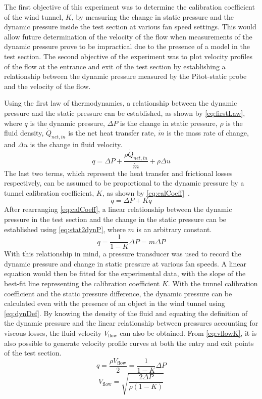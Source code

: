 \documentclass[journal,letterpaper]{IEEEtran}
\begin{document}
The first objective of this experiment was to determine the calibration coefficient of the wind tunnel, $K$, by measuring the change in static pressure and the dynamic pressure inside the test section at various fan speed settings.
This would allow future determination of the velocity of the flow when measurements of the dynamic pressure prove to be impractical due to the presence of a model in the test section.
The second objective of the experiment was to plot velocity profiles of the flow at the entrance and exit of the test section by establishing a relationship between the dynamic pressure measured by the Pitot-static probe and the velocity of the flow.

Using the first law of thermodynamics, a relationship between the dynamic pressure and the static pressure can be established, as shown by \eqref{eq:firstLaw}, where $q$ is the dynamic pressure, $\Delta P$ is the change in static pressure, $\rho$ is the fluid density, $\dot{Q}_{net,in}$ is the net heat transfer rate, $\dot{m}$ is the mass rate of change, and $\Delta u$ is the change in fluid velocity.
\begin{equation} \label{eq:firstLaw}
    q = \Delta P + \frac{\rho \dot{Q}_{net,in}}{\dot{m}} + \rho\Delta u
\end{equation}
The last two terms, which represent the heat transfer and frictional losses respectively, can be assumed to be proportional to the dynamic pressure by a tunnel calibration coefficient, $K$, as shown by \eqref{eq:calCoeff}~\cite{lecture}.
\begin{equation} \label{eq:calCoeff}
    q = \Delta P + Kq
\end{equation}
After rearranging \eqref{eq:calCoeff}, a linear relationship between the dynamic pressure in the test section and the change in the static pressure can be established using \eqref{eq:stat2dynP}, where $m$ is an arbitrary constant.
\begin{equation} \label{eq:stat2dynP}
    q = \frac{1}{1 - K}\Delta P = m\Delta P
\end{equation}
With this relationship in mind, a pressure transducer was used to record the dynamic pressure and change in static pressure at various fan speeds.
A linear equation would then be fitted for the experimental data, with the slope of the best-fit line representing the calibration coefficient $K$.
With the tunnel calibration coefficient and the static pressure difference, the dynamic pressure can be calculated even with the presence of an object in the wind tunnel using \eqref{eq:dynDef}. By knowing the density of the fluid and equating the definition of the dynamic pressure and the linear relationship between pressures accounting for viscous losses, the fluid velocity $V_\text{flow}$ can also be obtained. From \eqref{eq:vflowK}, it is also possible to generate velocity profile curves at both the entry and exit points of the test section.
\begin{equation} \label{eq:dynDef}
    q = \frac{\rho V_\text{flow}}{2} = \frac{1}{1 - K}\Delta P
\end{equation}
\begin{equation} \label{eq:vflowK}
    V_\text{flow} = \sqrt{\frac{2\Delta P}{\rho(1 - K)}}
\end{equation}
\end{document}
